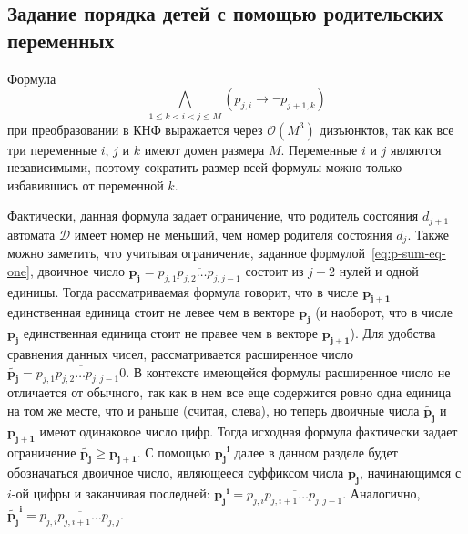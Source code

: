 
\subsection{Задание порядка детей с помощью родительских переменных}
\label{sec:space:tight:p-order}

Формула
\begin{equation*}
\bigwedge_{1 \leq k < i < j \leq M} \left(p_{j,i} \rightarrow \neg p_{j + 1, k}\right)
\end{equation*}
при преобразовании в КНФ выражается через $\mathcal{O}\left(M^{3}\right)$ дизъюнктов, так как все три переменные $i$, $j$ и $k$ имеют домен размера $M$.
Переменные $i$ и $j$ являются независимыми, поэтому сократить размер всей формулы можно только избавившись от переменной $k$.

Фактически, данная формула задает ограничение, что родитель состояния $d_{j + 1}$ автомата $\mathcal{D}$ имеет номер не меньший, чем номер родителя состояния $d_{j}$. 
Также можно заметить, что учитывая ограничение, заданное формулой~\eqref{eq:p-sum-eq-one}, двоичное число $\mathbf{p_{j}}=\overline{p_{j,1}p_{j,2}\ldots p_{j,j-1}}$ состоит из $j - 2$ нулей и одной единицы.
Тогда рассматриваемая формула говорит, что в числе $\mathbf{p_{j + 1}}$ единственная единица стоит не левее чем в векторе $\mathbf{p_{j}}$ (и наоборот, что в числе $\mathbf{p_{j}}$ единственная единица стоит не правее чем в векторе $\mathbf{p_{j + 1}}$). 
Для удобства сравнения данных чисел, рассматривается расширенное число $\tilde{\mathbf{p_{j}}} = \overline{p_{j,1}p_{j,2}\ldots p_{j,j-1}0}$.
В контексте имеющейся формулы расширенное число не отличается от обычного, так как в нем все еще содержится ровно одна единица на том же месте, что и раньше (считая, слева), но теперь двоичные числа $\tilde{\mathbf{p_{j}}}$ и $\mathbf{p_{j+1}}$ имеют одинаковое число цифр.
Тогда исходная формула фактически задает ограничение $\tilde{\mathbf{p_{j}}} \geq \mathbf{p_{j + 1}}$.
С помощью $\mathbf{p_{j}}^{\mathbf{i}}$ далее в данном разделе будет обозначаться двоичное число, являющееся суффиксом числа $\mathbf{p_{j}}$, начинающимся с $i$-ой цифры и заканчивая последней: $\mathbf{p_{j}}^{\mathbf{i}}=\overline{p_{j,i}p_{j,i+1}\ldots p_{j,j - 1}}$.
Аналогично, $\tilde{\mathbf{p_{j}}}^{\mathbf{i}}=\overline{p_{j,i}p_{j,i+1}\ldots p_{j,j}}$.

